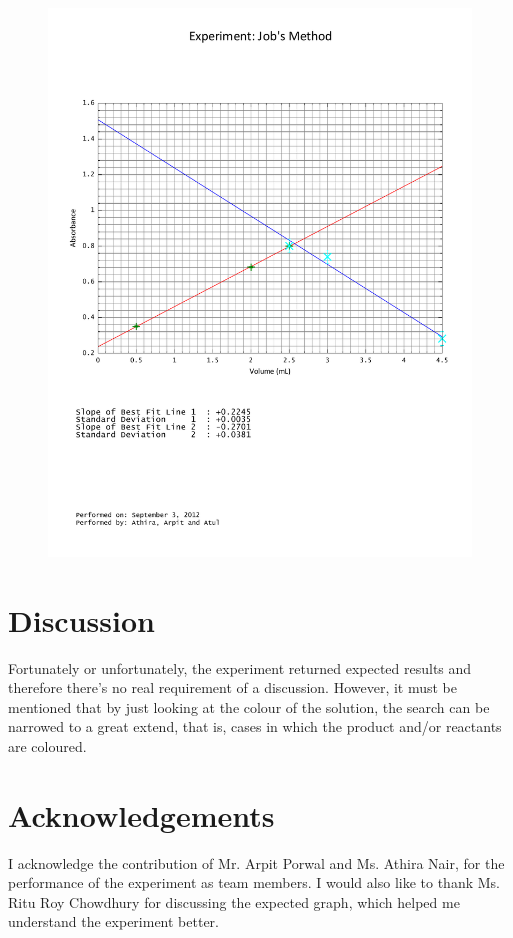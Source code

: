 	\begin{figure}[bth]
		\begin{center}
			\includegraphics[width=1.2\linewidth]{gfx/2A}
		\end{center}
	\caption[Absorbance with Varying Concentrations]{\label{2A_graph}}
	\end{figure}

\section{Discussion}
	Fortunately or unfortunately, the experiment returned expected results and therefore there's no real requirement of a discussion. However, it must be mentioned that by just looking at the colour of the solution, the search can be narrowed to a great extend, that is, cases in which the product and/or reactants are coloured.\\

\section{Acknowledgements}
	I acknowledge the contribution of Mr. Arpit Porwal and Ms. Athira Nair, for the performance of the experiment as team members. I would also like to thank Ms. Ritu Roy Chowdhury for discussing the expected graph, which helped me understand the experiment better.\\